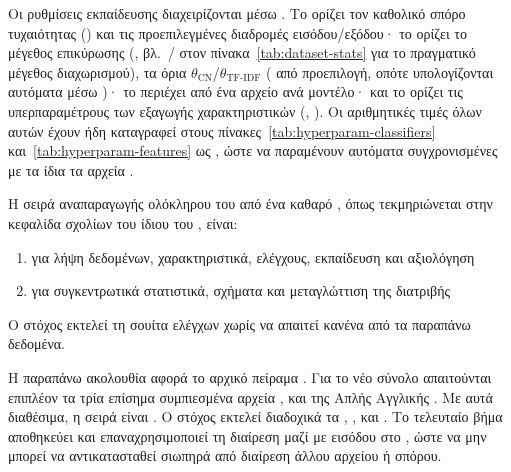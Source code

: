 Οι ρυθμίσεις εκπαίδευσης διαχειρίζονται μέσω .
Το \texttt{}
ορίζει τον καθολικό σπόρο τυχαιότητας (\texttt{}) και τις προεπιλεγμένες διαδρομές
εισόδου/\allowbreak{}εξόδου· το \texttt{} ορίζει το μέγεθος επικύρωσης
(\texttt{}, βλ.\ \TrainSplitSize{}/\allowbreak{}\ValSplitSize{} στον
πίνακα~\ref{tab:dataset-stats} για το πραγματικό μέγεθος διαχωρισμού), τα όρια
$\theta_{\mathrm{CN}}$/\allowbreak{}$\theta_{\mathrm{TF\text{-}IDF}}$ (\texttt{} από προεπιλογή, οπότε
υπολογίζονται αυτόματα μέσω \texttt{})· το \texttt{} περιέχει
από ένα αρχείο ανά μοντέλο· και το \texttt{} ορίζει τις
υπερπαραμέτρους των  εξαγωγής χαρακτηριστικών (, ). Οι αριθμητικές τιμές όλων αυτών έχουν ήδη καταγραφεί στους
πίνακες~\ref{tab:hyperparam-classifiers} και~\ref{tab:hyperparam-features} ως , ώστε να
παραμένουν αυτόματα συγχρονισμένες με τα ίδια τα αρχεία .

Η σειρά αναπαραγωγής ολόκληρου του  από ένα καθαρό , όπως
τεκμηριώνεται στην κεφαλίδα σχολίων του ίδιου του \texttt{}, είναι:

\begin{enumerate}
  \item \texttt{} για λήψη δεδομένων, χαρακτηριστικά,
        ελέγχους, εκπαίδευση και αξιολόγηση
  \item \texttt{} για συγκεντρωτικά στατιστικά, σχήματα
        και μεταγλώττιση της διατριβής
\end{enumerate}

Ο στόχος \texttt{} εκτελεί τη σουίτα  ελέγχων χωρίς να απαιτεί κανένα από
τα παραπάνω δεδομένα.

Η παραπάνω ακολουθία αφορά το αρχικό πείραμα .
Για το νέο σύνολο
απαιτούνται επιπλέον τα τρία επίσημα συμπιεσμένα αρχεία 
\texttt{}, \texttt{} και \texttt{} της
Απλής Αγγλικής .
Με αυτά διαθέσιμα, η σειρά είναι
\texttt{}.
Ο στόχος εκτελεί διαδοχικά τα
\texttt{}, \texttt{},
\texttt{} και
\texttt{}.
Το τελευταίο βήμα αποθηκεύει και
επαναχρησιμοποιεί τη διαίρεση μαζί με  εισόδου στο
\texttt{}, ώστε να μην μπορεί να
αντικατασταθεί σιωπηρά από διαίρεση άλλου αρχείου ή σπόρου.


